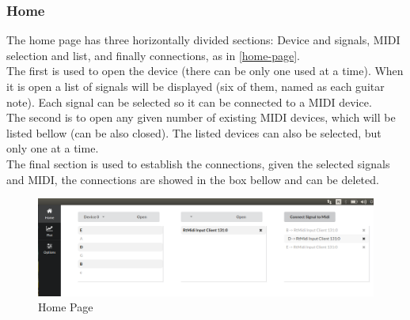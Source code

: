 \subsubsection{Home}
The home page has three horizontally divided sections: Device and signals, MIDI selection
and list, and  finally connections, as in \autoref{home-page}. \\
The first is used to open the device (there can be only one used at a time). When it
is open a list of signals will be displayed (six of them, named as each guitar note).
Each signal can be selected so it can be connected to a MIDI device.\\
The second is to open any given number of existing MIDI devices, which will be listed
bellow (can be also closed). The listed devices can also be selected, but only one at a time. \\
The final section is used to establish the connections, given the selected signals
and MIDI, the connections are showed in the box bellow and can be deleted.
\begin{figure}[htb]
	\caption{Home Page}
  \label{home-page}
	\begin{center}
    \includegraphics[width=0.7\paperwidth]{images/snapshots/home.png}
	\end{center}
\end{figure}

